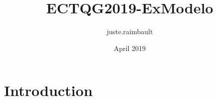 \documentclass{article}
\title{ECTQG2019-ExModelo}
\author{juste.raimbault }
\date{April 2019}
\begin{document}
\maketitle

\section{Introduction}
\end{document}
